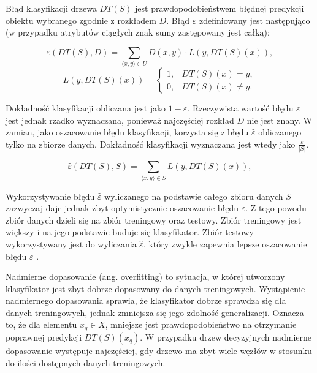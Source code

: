 \documentclass[12pt]{article}
\begin{document}
Błąd klasyfikacji drzewa $DT(S)$ jest prawdopodobieństwem błędnej predykcji obiektu wybranego zgodnie z rozkładem $D$.
Błąd $\varepsilon$ zdefiniowany jest następująco (w przypadku atrybutów ciągłych znak sumy zastępowany jest całką):

\begin{equation}
    \varepsilon(DT(S), D) = \displaystyle\sum_{\langle x, y\rangle \in U} D(x, y) \cdot L(y, DT(S)(x)),
\end{equation}
\begin{equation}
    L(y, DT(S)(x)) = \left\{
        \begin{array}{ll}
            1, & DT(S)(x) = y, \\
            0, & DT(S)(x) \neq y.
        \end{array} \right.
\end{equation}

\vspace{0.8cm}

Dokładność klasyfikacji obliczana jest jako $1 - \varepsilon$.
Rzeczywista wartość błędu $\varepsilon$ jest jednak rzadko wyznaczana, ponieważ najczęściej rozkład $D$ nie jest znany.
W zamian, jako oszacowanie błędu klasyfikacji, korzysta się z błędu $\hat{\varepsilon}$
obliczanego tylko na zbiorze danych. Dokładność klasyfikacji wyznaczana jest wtedy jako $\frac{\hat{\varepsilon}}{|S|}$.

\begin{equation}
    \hat{\varepsilon}(DT(S), S) = \displaystyle\sum_{\langle x, y\rangle \in S} L(y, DT(S)(x)),
\end{equation}

\vspace{0.8cm}

Wykorzystywanie błędu $\hat{\varepsilon}$ wyliczanego na podstawie całego zbioru danych $S$ zazwyczaj daje jednak
zbyt optymistycznie oszacowanie błędu $\varepsilon$. Z tego powodu zbiór danych dzieli się na zbiór
treningowy oraz testowy. Zbiór treningowy jest większy i na jego podstawie buduje się klasyfikator.
Zbiór testowy wykorzystywany jest do wyliczania $\hat{\varepsilon}$, który zwykle zapewnia
lepsze oszacowanie błędu $\varepsilon$ \cite{data-mining-with-decision-trees}.

Nadmierne dopasowanie (ang. overfitting) to sytuacja, w której utworzony klasyfikator jest zbyt
dobrze dopasowany do danych treningowych. Wystąpienie nadmiernego dopasowania sprawia, że
klasyfikator dobrze sprawdza się dla danych treningowych, jednak zmniejsza się jego zdolność
generalizacji. Oznacza to, że dla elementu $x_q \in X$, mniejsze jest prawdopodobieństwo na otrzymanie
poprawnej predykcji $DT(S)(x_q)$. W przypadku drzew decyzyjnych nadmierne dopasowanie
występuje najczęściej, gdy drzewo ma zbyt wiele węzłów w stosunku do ilości dostępnych danych treningowych.
\end{document}
